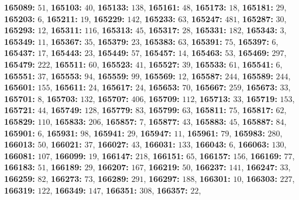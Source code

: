 \textsf{\bfseries 165089:} $51$, \textsf{\bfseries 165103:} $40$, \textsf{\bfseries 165133:} $138$, \textsf{\bfseries 165161:} $48$, \textsf{\bfseries 165173:} $18$, \textsf{\bfseries 165181:} $29$, \textsf{\bfseries 165203:} $6$, \textsf{\bfseries 165211:} $19$, \textsf{\bfseries 165229:} $142$, \textsf{\bfseries 165233:} $63$, \textsf{\bfseries 165247:} $481$, \textsf{\bfseries 165287:} $30$, \textsf{\bfseries 165293:} $12$, \textsf{\bfseries 165311:} $116$, \textsf{\bfseries 165313:} $45$, \textsf{\bfseries 165317:} $28$, \textsf{\bfseries 165331:} $182$, \textsf{\bfseries 165343:} $3$, \textsf{\bfseries 165349:} $11$, \textsf{\bfseries 165367:} $35$, \textsf{\bfseries 165379:} $23$, \textsf{\bfseries 165383:} $63$, \textsf{\bfseries 165391:} $75$, \textsf{\bfseries 165397:} $6$, \textsf{\bfseries 165437:} $17$, \textsf{\bfseries 165443:} $23$, \textsf{\bfseries 165449:} $57$, \textsf{\bfseries 165457:} $14$, \textsf{\bfseries 165463:} $53$, \textsf{\bfseries 165469:} $297$, \textsf{\bfseries 165479:} $222$, \textsf{\bfseries 165511:} $60$, \textsf{\bfseries 165523:} $41$, \textsf{\bfseries 165527:} $39$, \textsf{\bfseries 165533:} $61$, \textsf{\bfseries 165541:} $6$, \textsf{\bfseries 165551:} $37$, \textsf{\bfseries 165553:} $94$, \textsf{\bfseries 165559:} $99$, \textsf{\bfseries 165569:} $12$, \textsf{\bfseries 165587:} $244$, \textsf{\bfseries 165589:} $244$, \textsf{\bfseries 165601:} $155$, \textsf{\bfseries 165611:} $24$, \textsf{\bfseries 165617:} $24$, \textsf{\bfseries 165653:} $70$, \textsf{\bfseries 165667:} $259$, \textsf{\bfseries 165673:} $33$, \textsf{\bfseries 165701:} $8$, \textsf{\bfseries 165703:} $132$, \textsf{\bfseries 165707:} $406$, \textsf{\bfseries 165709:} $112$, \textsf{\bfseries 165713:} $33$, \textsf{\bfseries 165719:} $153$, \textsf{\bfseries 165721:} $44$, \textsf{\bfseries 165749:} $128$, \textsf{\bfseries 165779:} $83$, \textsf{\bfseries 165799:} $63$, \textsf{\bfseries 165811:} $75$, \textsf{\bfseries 165817:} $62$, \textsf{\bfseries 165829:} $110$, \textsf{\bfseries 165833:} $206$, \textsf{\bfseries 165857:} $7$, \textsf{\bfseries 165877:} $43$, \textsf{\bfseries 165883:} $45$, \textsf{\bfseries 165887:} $84$, \textsf{\bfseries 165901:} $6$, \textsf{\bfseries 165931:} $98$, \textsf{\bfseries 165941:} $29$, \textsf{\bfseries 165947:} $11$, \textsf{\bfseries 165961:} $79$, \textsf{\bfseries 165983:} $280$, \textsf{\bfseries 166013:} $50$, \textsf{\bfseries 166021:} $37$, \textsf{\bfseries 166027:} $43$, \textsf{\bfseries 166031:} $133$, \textsf{\bfseries 166043:} $6$, \textsf{\bfseries 166063:} $130$, \textsf{\bfseries 166081:} $107$, \textsf{\bfseries 166099:} $19$, \textsf{\bfseries 166147:} $218$, \textsf{\bfseries 166151:} $65$, \textsf{\bfseries 166157:} $156$, \textsf{\bfseries 166169:} $77$, \textsf{\bfseries 166183:} $51$, \textsf{\bfseries 166189:} $29$, \textsf{\bfseries 166207:} $167$, \textsf{\bfseries 166219:} $50$, \textsf{\bfseries 166237:} $141$, \textsf{\bfseries 166247:} $33$, \textsf{\bfseries 166259:} $82$, \textsf{\bfseries 166273:} $73$, \textsf{\bfseries 166289:} $291$, \textsf{\bfseries 166297:} $188$, \textsf{\bfseries 166301:} $10$, \textsf{\bfseries 166303:} $227$, \textsf{\bfseries 166319:} $122$, \textsf{\bfseries 166349:} $147$, \textsf{\bfseries 166351:} $308$, \textsf{\bfseries 166357:} $22$, 
